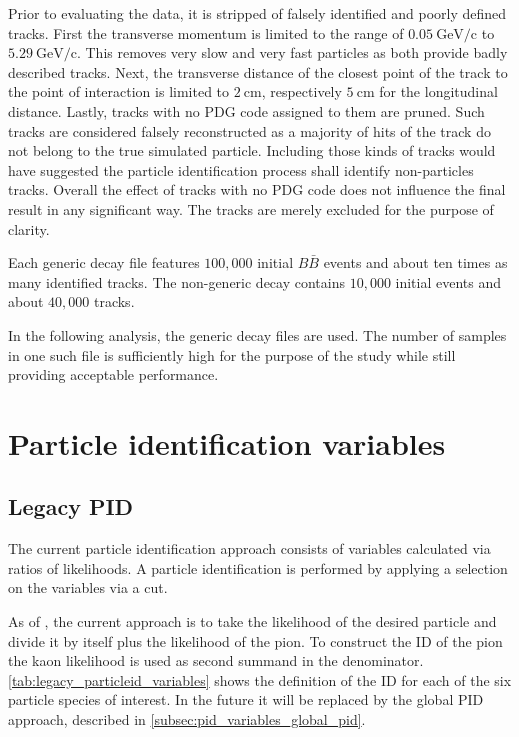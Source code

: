 Prior to evaluating the data, it is stripped of falsely identified and poorly defined tracks. First the transverse momentum is limited to the range of $0.05 \mathrm{~GeV/c}$ to $5.29 \mathrm{~GeV/c}$. This removes very slow and very fast particles as both provide badly described tracks. Next, the transverse distance of the closest point of the track to the point of interaction is limited to $2 \mathrm{~cm}$, respectively $5 \mathrm{~cm}$ for the longitudinal distance. Lastly, tracks with no PDG code assigned to them are pruned. Such tracks are considered falsely reconstructed as a majority of hits of the track do not belong to the true simulated particle. Including those kinds of tracks would have suggested the particle identification process shall identify non-particles tracks. Overall the effect of tracks with no PDG code does not influence the final result in any significant way. The tracks are merely excluded for the purpose of clarity.

Each generic decay file features $100,000$ initial $B \bar{B}$ events and about ten times as many identified tracks. The non-generic decay contains $10,000$ initial events and about $40,000$ tracks.

In the following analysis, the generic decay files are used. The number of samples in one such file is sufficiently high for the purpose of the study while still providing acceptable performance.

\section{Particle identification variables}
\label{sec:pid_variables}

\subsection{Legacy PID}
\label{subsec:pid_variables_legacy_pid}

The current particle identification approach consists of variables calculated via ratios of likelihoods. A particle identification is performed by applying a selection on the variables via a cut.

As of , the current approach is to take the likelihood of the desired particle and divide it by itself plus the likelihood of the pion. To construct the ID of the pion the kaon likelihood is used as second summand in the denominator. \autoref{tab:legacy_particleid_variables} shows the definition of the ID for each of the six particle species of interest. In the future it will be replaced by the global PID approach, described in \autoref{subsec:pid_variables_global_pid}.

